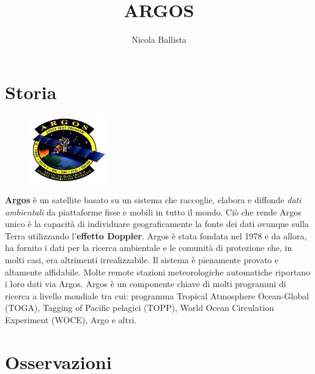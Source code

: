 \documentclass[12pt,a4paper]{article}
\begin{document}
\title{\vspace{-70pt}ARGOS}
\author{Nicola Ballista}
\date{}
\maketitle
\pagestyle{empty}
\thispagestyle{empty}


\def\nomedelsatellite{ARGOS}
\def\autore{Ballista Nicola}

\section*{Storia}
\label{storia}
\begin{figure}
  \vspace{-10pt}
  \begin{center}
    \includegraphics[width=0.30\textwidth]{satellite}
  \end{center}
  \vspace{-20pt}
\end{figure}
\textbf{Argos} è un satellite basato su un sistema che raccoglie, elabora e diffonde \emph{dati ambientali} da piattaforme fisse e mobili in tutto il mondo. Ciò che rende Argos unico è la capacità di individuare geograficamente la fonte dei dati ovunque sulla Terra utilizzando l'\textbf{effetto Doppler}.
Argos è stata fondata nel 1978 e da allora, ha fornito i dati per la ricerca ambientale e le comunità di protezione che, in molti casi, era altrimenti irrealizzabile. Il sistema è pienamente provato e altamente affidabile. Molte remote stazioni meteorologiche automatiche riportano i loro dati via Argos. Argos è un componente chiave di molti programmi di ricerca a livello mondiale tra cui: programma Tropical Atmosphere Ocean-Global (TOGA), Tagging of Pacific pelagici (TOPP), World Ocean Circulation Experiment (WOCE), Argo e altri.

\section*{Osservazioni}
\label{osservazioni}
\end{document}
